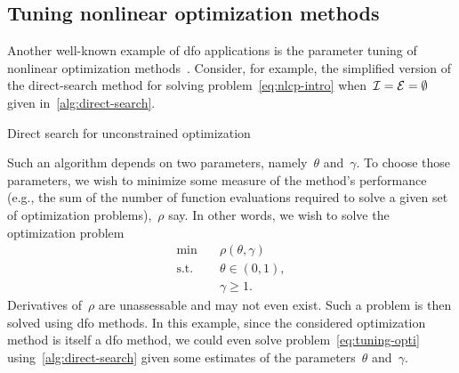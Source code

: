 \subsection{Tuning nonlinear optimization methods}

Another well-known example of \gls{dfo} applications is the parameter tuning of nonlinear optimization methods~\cite{Audet_Orban_2006}.
Consider, for example, the simplified version of the direct-search method for solving problem~\cref{eq:nlcp-intro} when~$\mathcal{I} = \mathcal{E} = \emptyset$ given in~\cref{alg:direct-search}.

\begin{algorithm}[htp]
    \DontPrintSemicolon
    \caption{Direct search for unconstrained optimization}
    \label{alg:direct-search}
\end{algorithm}

Such an algorithm depends on two parameters, namely~$\theta$ and~$\gamma$.
To choose those parameters, we wish to minimize some measure of the method's performance (e.g., the sum of the number of function evaluations required to solve a given set of optimization problems),~$\rho$ say.
In other words, we wish to solve the optimization problem
\begin{subequations}
    \label{eq:tuning-opti}
    \begin{align}
        \min        & \quad \rho(\theta, \gamma) \label{eq:tuning-opti-obj}\\
        \text{s.t.} & \quad \theta \in (0, 1), \label{eq:tuning-opti-theta}\\
                    & \quad \gamma \ge 1. \label{eq:tuning-opti-gamma}
    \end{align}
\end{subequations}
Derivatives of~$\rho$ are unassessable and may not even exist.
Such a problem is then solved using \gls{dfo} methods.
In this example, since the considered optimization method is itself a \gls{dfo} method, we could even solve problem~\cref{eq:tuning-opti} using~\cref{alg:direct-search} given some estimates of the parameters~$\theta$ and~$\gamma$.

